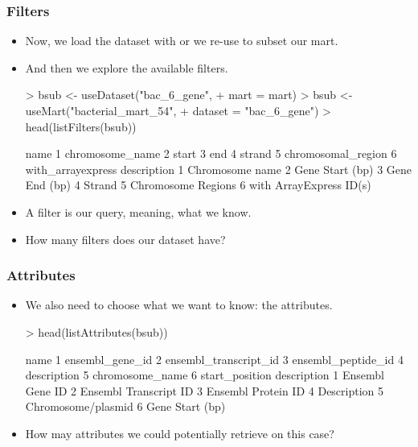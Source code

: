 \begin{frame}
  \frametitle{Filters}
  \begin{itemize}
  \item Now, we load the dataset with  or we re-use  to subset our mart.
  \item And then we explore the available \alert{filters}.
\begin{Schunk}
\begin{Sinput}
> bsub <- useDataset("bac_6_gene", 
+     mart = mart)
> bsub <- useMart("bacterial_mart_54", 
+     dataset = "bac_6_gene")
> head(listFilters(bsub))
\end{Sinput}
\begin{Soutput}
                name
1    chromosome_name
2              start
3                end
4             strand
5 chromosomal_region
6  with_arrayexpress
              description
1         Chromosome name
2         Gene Start (bp)
3           Gene End (bp)
4                  Strand
5      Chromosome Regions
6 with ArrayExpress ID(s)
\end{Soutput}
\end{Schunk}
  \item A filter is our query, meaning, what we know.
  \item How many filters does our dataset have?
  \end{itemize}
\end{frame}

\begin{frame}
  \frametitle{Attributes}
  \begin{itemize}
  \item We also need to choose what we want to know: the \alert{attributes}.
\begin{Schunk}
\begin{Sinput}
> head(listAttributes(bsub))
\end{Sinput}
\begin{Soutput}
                   name
1       ensembl_gene_id
2 ensembl_transcript_id
3    ensembl_peptide_id
4           description
5       chromosome_name
6        start_position
            description
1       Ensembl Gene ID
2 Ensembl Transcript ID
3    Ensembl Protein ID
4           Description
5    Chromosome/plasmid
6       Gene Start (bp)
\end{Soutput}
\end{Schunk}
  \item How may attributes we could potentially retrieve on this case?
  \end{itemize}
\end{frame}

